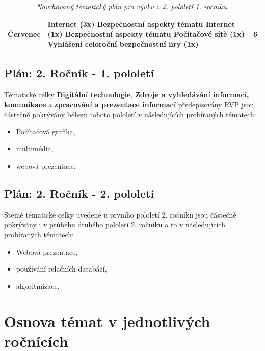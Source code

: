 \documentclass[a4paper, 12pt]{article}
\begin{document}
\begin{table}[h!]
\begin{tabular}{| l | p{11cm} | p{2cm} |}
    Červenec &
        Internet (3x) \newline
        Bezpečnostní aspekty tématu Internet (1x) \newline
        Bezpečnostní aspekty tématu Počítačové sítě (1x) \newline
        Vyhlášení celoroční bezpečnostní hry (1x) &
        6 \newline 1 \newline 1 \newline 1
    \\ \hline
\end{tabular}
    \caption{\textit{Navrhovaný tématický plán pro výuku v 2. pololetí 1. ročníku.}}
\end{table}


\subsection{Plán: 2. Ročník - 1. pololetí}
Tématické celky \textbf{Digitální technologie}, \textbf{Zdroje a vyhledávání informací, komunikace} a \textbf{zpracování a prezentace informací} předepisovány RVP jsou částečně pokrývány během tohoto pololetí v následujících probíraných tématech:
\begin{itemize}
    \setlength{\itemsep}{-3pt}
    \item Počítačová grafika,
    \item multimédia,
    \item webová prezentace,
\end{itemize}


\subsection{Plán: 2. Ročník - 2. pololetí}
Stejné tématické celky uvedené u prvního pololetí 2. ročníku jsou částečně pokrývány i v průběhu druhého pololetí 2. ročníku a to v následujících probíraných tématech:
\begin{itemize}
    \setlength{\itemsep}{-3pt}
    \item Webová prezentace,
    \item používání relačních databází,
    \item algoritmizace.
\end{itemize}




\newpage
\section{Osnova témat v jednotlivých ročnících}
\end{document}
